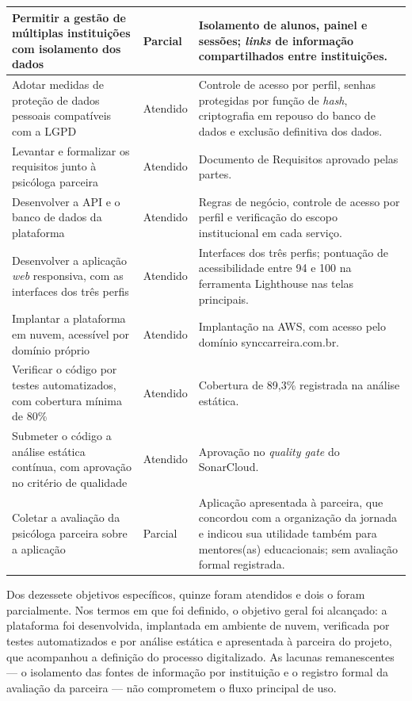 {\begin{xltabular}{\textwidth}{|>{\raggedright\arraybackslash}X|>{\raggedright\arraybackslash}p{2.2cm}|>{\raggedright\arraybackslash}p{5.8cm}|}
\hline
Permitir a gestão de múltiplas instituições com isolamento dos dados & Parcial & Isolamento de alunos, painel e sessões; \textit{links} de informação compartilhados entre instituições. \\
\hline
Adotar medidas de proteção de dados pessoais compatíveis com a LGPD & Atendido & Controle de acesso por perfil, senhas protegidas por função de \textit{hash}, criptografia em repouso do banco de dados e exclusão definitiva dos dados. \\
\hline
Levantar e formalizar os requisitos junto à psicóloga parceira & Atendido & Documento de Requisitos aprovado pelas partes. \\
\hline
Desenvolver a API e o banco de dados da plataforma & Atendido & Regras de negócio, controle de acesso por perfil e verificação do escopo institucional em cada serviço. \\
\hline
Desenvolver a aplicação \textit{web} responsiva, com as interfaces dos três perfis & Atendido & Interfaces dos três perfis; pontuação de acessibilidade entre 94 e 100 na ferramenta Lighthouse nas telas principais. \\
\hline
Implantar a plataforma em nuvem, acessível por domínio próprio & Atendido & Implantação na AWS, com acesso pelo domínio synccarreira.com.br. \\
\hline
Verificar o código por testes automatizados, com cobertura mínima de 80\% & Atendido & Cobertura de 89,3\% registrada na análise estática. \\
\hline
Submeter o código a análise estática contínua, com aprovação no critério de qualidade & Atendido & Aprovação no \textit{quality gate} do SonarCloud. \\
\hline
Coletar a avaliação da psicóloga parceira sobre a aplicação & Parcial & Aplicação apresentada à parceira, que concordou com a organização da jornada e indicou sua utilidade também para mentores(as) educacionais; sem avaliação formal registrada. \\
\hline
\end{xltabular}
}

Dos dezessete objetivos específicos, quinze foram atendidos e dois o foram parcialmente. Nos termos em que foi definido, o objetivo geral foi alcançado: a plataforma foi desenvolvida, implantada em ambiente de nuvem, verificada por testes automatizados e por análise estática e apresentada à parceira do projeto, que acompanhou a definição do processo digitalizado. As lacunas remanescentes --- o isolamento das fontes de informação por instituição e o registro formal da avaliação da parceira --- não comprometem o fluxo principal de uso.

